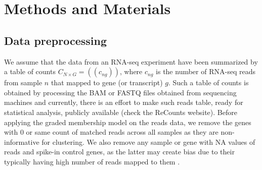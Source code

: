 \section{Methods and Materials}

\subsection{Data preprocessing}

We assume that the data from an RNA-seq experiment have been summarized by a table of counts $C_{N \times G} = ((c_{ng}))$, where $c_{ng}$ is the number of RNA-seq reads from sample $n$ that mapped to gene (or transcript) $g$. Such a table of counts is obtained by processing the BAM or FASTQ files obtained from sequencing machines and currently, there is an effort to make such reads table, ready for statistical analysis, publicly available (check the ReCounts website\cite{Frazee2011}). Before applying the graded membership model on the reads data, we remove the genes with 0 or same count of matched reads across all samples as they are non-informative for clustering. We also remove any sample or gene with NA values of reads and  spike-in control genes,  as the latter may create bias due to their typically having high number of reads mapped to them \cite{Jiang2011}. 

%

 
